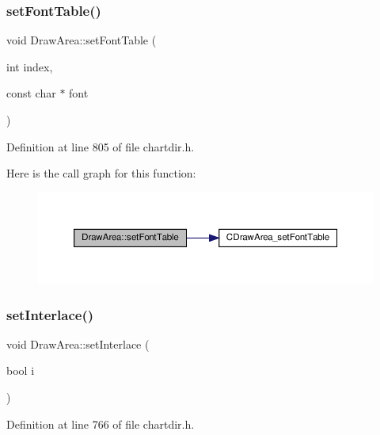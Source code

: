 \subsubsection{\texorpdfstring{set\+Font\+Table()}{setFontTable()}}
{\footnotesize\ttfamily void Draw\+Area\+::set\+Font\+Table (\begin{DoxyParamCaption}\item[{int}]{index,  }\item[{const char $\ast$}]{font }\end{DoxyParamCaption})\hspace{0.3cm}{\ttfamily [inline]}}



Definition at line 805 of file chartdir.\+h.

Here is the call graph for this function\+:
\nopagebreak
\begin{figure}[H]
\begin{center}
\leavevmode
\includegraphics[width=350pt]{class_draw_area_af3fd7897c1261ffb8f0a41b9a2e30e78_cgraph}
\end{center}
\end{figure}
\mbox{\label{class_draw_area_a06bf510fdff11b5e46a3c3827713b4c1}} 
\subsubsection{\texorpdfstring{set\+Interlace()}{setInterlace()}}
{\footnotesize\ttfamily void Draw\+Area\+::set\+Interlace (\begin{DoxyParamCaption}\item[{bool}]{i }\end{DoxyParamCaption})\hspace{0.3cm}{\ttfamily [inline]}}



Definition at line 766 of file chartdir.\+h.


